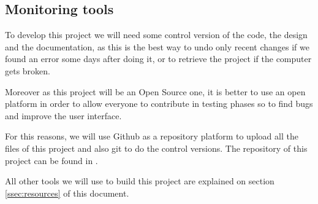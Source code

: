 \subsection{Monitoring tools}

To develop this project we will need some control version of the code, the design and the documentation, as this is the best way to undo only recent changes if we found an error some days after doing it, or to retrieve the project if the computer gets broken. 

Moreover as this project will be an Open Source one, it is better to use an open platform in order to allow everyone to contribute in testing phases so to find bugs and improve the user interface. 

\pagebreak
For this reasons, we will use Github as a repository platform to upload all the files of this project and also git to do the control versions. The repository of this project can be found in \cite{ThisProjectGit}.

All other tools we will use to build this project are explained on section \ref{ssec:resources} of this document.